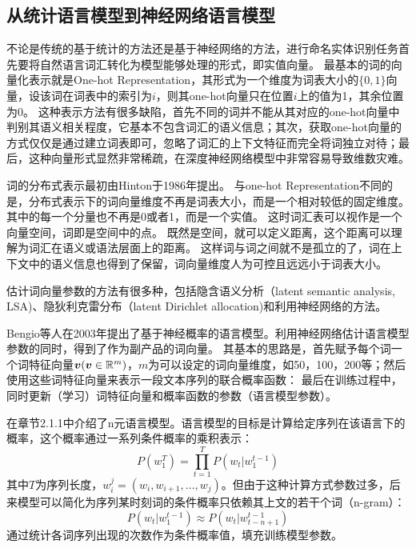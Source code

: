 \subsection{从统计语言模型到神经网络语言模型}
不论是传统的基于统计的方法还是基于神经网络的方法，进行命名实体识别任务首先要将自然语言词汇转化为模型能够处理的形式，即实值向量。
最基本的词的向量化表示就是One-hot Representation，其形式为一个维度为词表大小的$\{0, 1\}$向量，设该词在词表中的索引为$i$，则其one-hot向量只在位置$i$上的值为1，其余位置为0。
这种表示方法有很多缺陷，首先不同的词并不能从其对应的one-hot向量中判别其语义相关程度，它基本不包含词汇的语义信息；其次，获取one-hot向量的方式仅仅是通过建立词表即可，忽略了词汇的上下文特征而完全将词独立对待；最后，这种向量形式显然非常稀疏，在深度神经网络模型中非常容易导致维数灾难。

词的分布式表示最初由Hinton于1986年提出。
与one-hot Representation不同的是，分布式表示下的词向量维度不再是词表大小，而是一个相对较低的固定维度。其中的每一个分量也不再是0或者1，而是一个实值。
这时词汇表可以视作是一个向量空间，词即是空间中的点。
既然是空间，就可以定义距离，这个距离可以理解为词汇在语义或语法层面上的距离。
这样词与词之间就不是孤立的了，词在上下文中的语义信息也得到了保留，词向量维度人为可控且远远小于词表大小。

估计词向量参数的方法有很多种，包括隐含语义分析（latent semantic analysis, LSA)、隐狄利克雷分布（latent Dirichlet allocation)和利用神经网络的方法。

Bengio等人在2003年提出了基于神经概率的语言模型。利用神经网络估计语言模型参数的同时，得到了作为副产品的词向量。
其基本的思路是，首先赋予每个词一个词特征向量$\boldsymbol{v}(\boldsymbol{v}\in \mathbb{R}^m)$，$m$为可以设定的词向量维度，如50，100，200等；然后使用这些词特征向量来表示一段文本序列的联合概率函数：
最后在训练过程中，同时更新（学习）词特征向量和概率函数的参数（语言模型参数）。

在章节2.1.1中介绍了n元语言模型。语言模型的目标是计算给定序列在该语言下的概率，这个概率通过一系列条件概率的乘积表示：
\begin{equation}
    P(w^T_1) = \prod^{T}_{t=1}P(w_t|w_1^{t-1})
\end{equation}
其中$T$为序列长度，$w_i^j = (w_i, w_{i+1},\dots, w_j)$。但由于这种计算方式参数过多，后来模型可以简化为序列某时刻词的条件概率只依赖其上文的若干个词（n-gram）：
\begin{equation}
    P(w_t|w_1^{t-1}) \approx P(w_t|w^{t-1}_{t-n+1})
\end{equation}
通过统计各词序列出现的次数作为条件概率值，填充训练模型参数。

